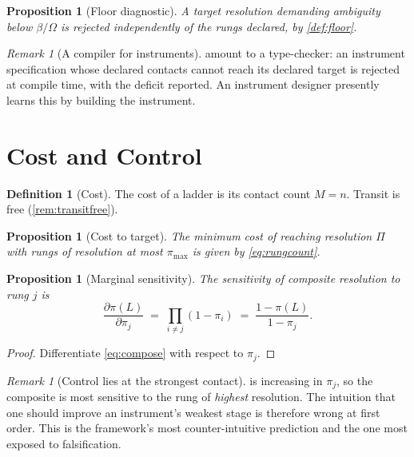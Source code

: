 \documentclass[11pt,a4paper]{article}
\theoremstyle{plain}
\newtheorem{proposition}[theorem]{Proposition}
\theoremstyle{definition}
\newtheorem{definition}[theorem]{Definition}
\theoremstyle{remark}
\newtheorem{remark}[theorem]{Remark}
\newcommand{\flo}{\beta}
\newcommand{\pow}{\pi}
\newcommand{\Tot}{\Omega}
\newcommand{\Lad}{L}
\begin{document}
\begin{proposition}[Floor diagnostic]
\label{prop:floordiag}
A target resolution demanding ambiguity below $\flo/\Tot$ is rejected
independently of the rungs declared, by \cref{def:floor}.
\end{proposition}

\begin{remark}[A compiler for instruments]
\label{rem:compiler}
 amount to a type-checker: an
instrument specification whose declared contacts cannot reach its declared
target is rejected at compile time, with the deficit reported. An instrument
designer presently learns this by building the instrument.
\end{remark}

\section{Cost and Control}
\label{sec:cost}

\begin{definition}[Cost]
\label{def:cost}
The cost of a ladder is its contact count $M = n$. Transit is free
(\cref{rem:transitfree}).
\end{definition}

\begin{proposition}[Cost to target]
\label{prop:costtarget}
The minimum cost of reaching resolution $\Pi$ with rungs of resolution at most
$\pow_{\max}$ is given by \cref{eq:rungcount}.
\end{proposition}

\begin{proposition}[Marginal sensitivity]
\label{prop:marginal}
The sensitivity of composite resolution to rung $j$ is
\begin{equation}
\label{eq:marginal}
\frac{\partial \pow(\Lad)}{\partial \pow_j}
\;=\; \prod_{i \neq j}(1 - \pow_i)
\;=\; \frac{1 - \pow(\Lad)}{1 - \pow_j}.
\end{equation}
\end{proposition}

\begin{proof}
Differentiate \cref{eq:compose} with respect to $\pow_j$.
\end{proof}

\begin{remark}[Control lies at the strongest contact]
\label{rem:direction}
 is increasing in $\pow_j$, so the composite is most sensitive
to the rung of \emph{highest} resolution. The intuition that one should improve
an instrument's weakest stage is therefore wrong at first order. This is the
framework's most counter-intuitive prediction and the one most exposed to
falsification.
\end{remark}
\end{document}
